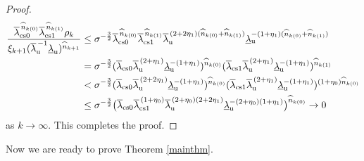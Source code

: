 \documentclass{amsart}
\theoremstyle{plain}
\theoremstyle{definition}
\numberwithin{equation}{section}
\numberwithin{figure}{section}
\def\wh{\widehat}
\def\ul{\underline}
\def\ol{\overline}
\def\ru{{\mathrm{u}}}
\begin{document}
\begin{proof}
\begin{align*}
\frac{\ol\lambda_{\rm cs0}^{\,\widehat n_{k(0)}}\ol\lambda_{\rm cs1}^{\,\widehat n_{k(1)}}\rho_{k}}{\xi_{k+1}(\ol\lambda_{\ru}^{\,-1}\ul\lambda_{\ru})^{\wh n_{k+1}}}
&
\leq \sigma^{-\frac{3}{2}} \ol\lambda_{\rm cs0}^{\,\widehat n_{k(0)}}\ol\lambda_{\rm cs1}^{\,\widehat n_{k(1)}} \ol{\lambda}_{\rm u}^{\,(2+2\eta_1)(\widehat n_{k(0)}+\widehat n_{k(1)})}\ul\lambda_{\ru}^{-(1+\eta_1)(\widehat n_{k(0)}+\widehat n_{k(1)})}\\
&= 
\sigma^{-\frac32}
(\ol\lambda_{\rm cs0}\ol\lambda_{\mathrm{u}}^{\,(2+\eta_{1})}\ul\lambda_{\ru}^{-(1+\eta_1)})^{\widehat n_{k(0)}}(\ol\lambda_{\rm cs1}\ol\lambda_{\mathrm{u}}^{\,(2+\eta_{1})}\ul\lambda_{\ru}^{-(1+\eta_1)})^{\widehat n_{k(1)}}\\
&<
\sigma^{-\frac32}
(\ol\lambda_{\rm cs0}\ol\lambda_{\mathrm{u}}^{\,(2+2\eta_{1})}\ul\lambda_{\ru}^{-(1+\eta_1)})^{\widehat n_{k(0)}}(\ol\lambda_{\rm cs1}\ol\lambda_{\mathrm{u}}^{\,(2+\eta_{1})}\ul\lambda_{\ru}^{-(1+\eta_1)})^{(1+\eta_0)\widehat n_{k(0)}}\\
&\leq 
\sigma^{-\frac32}
\bigl(\ol\lambda_{\rm cs0}\ol\lambda_{\rm cs1}^{\,(1+\eta_0)}\ol\lambda_{\mathrm{u}}^{\,(2+\eta_0)(2+2\eta_{1})}\ul\lambda_{\ru}^{-(2+\eta_0)(1+\eta_1)}\bigr)^{\widehat n_{k(0)}}\rightarrow 0
\end{align*}
as $k\rightarrow \infty$.
This completes the proof.
\end{proof}


Now we are ready to prove Theorem \ref{mainthm}.
\end{document}
